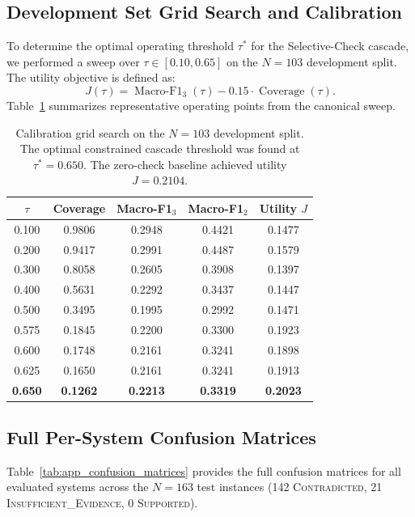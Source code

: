 \subsection{Development Set Grid Search and Calibration}
\label{sec:app_tuning}
To determine the optimal operating threshold $\tau^*$ for the Selective-Check cascade, we performed a sweep over $\tau \in [0.10, 0.65]$ on the $N=103$ development split. The utility objective is defined as:
\begin{equation}
    J(\tau) = \operatorname{Macro-F1}_3(\tau) - 0.15 \cdot \operatorname{Coverage}(\tau).
\end{equation}
Table~\ref{tab:app_tuning_sweep} summarizes representative operating points from the canonical sweep.

\begin{table}[h]
\centering
\small
\begin{tabular}{ccccc}
\toprule
$\tau$ & \textbf{Coverage} & \textbf{Macro-F1}$_3$ & \textbf{Macro-F1}$_2$ & \textbf{Utility $J$} \\
\midrule
0.100 & 0.9806 & 0.2948 & 0.4421 & 0.1477 \\
0.200 & 0.9417 & 0.2991 & 0.4487 & 0.1579 \\
0.300 & 0.8058 & 0.2605 & 0.3908 & 0.1397 \\
0.400 & 0.5631 & 0.2292 & 0.3437 & 0.1447 \\
0.500 & 0.3495 & 0.1995 & 0.2992 & 0.1471 \\
0.575 & 0.1845 & 0.2200 & 0.3300 & 0.1923 \\
0.600 & 0.1748 & 0.2161 & 0.3241 & 0.1898 \\
0.625 & 0.1650 & 0.2161 & 0.3241 & 0.1913 \\
\textbf{0.650} & \textbf{0.1262} & \textbf{0.2213} & \textbf{0.3319} & \textbf{0.2023} \\
\bottomrule
\end{tabular}
\caption{Calibration grid search on the $N=103$ development split. The optimal constrained cascade threshold was found at $\tau^* = 0.650$. The zero-check baseline achieved utility $J = 0.2104$.}
\label{tab:app_tuning_sweep}
\end{table}

\subsection{Full Per-System Confusion Matrices}
\label{sec:app_confusion}
Table~\ref{tab:app_confusion_matrices} provides the full confusion matrices for all evaluated systems across the $N=163$ test instances (142 \textsc{Contradicted}, 21 \textsc{Insufficient\_Evidence}, 0 \textsc{Supported}).

